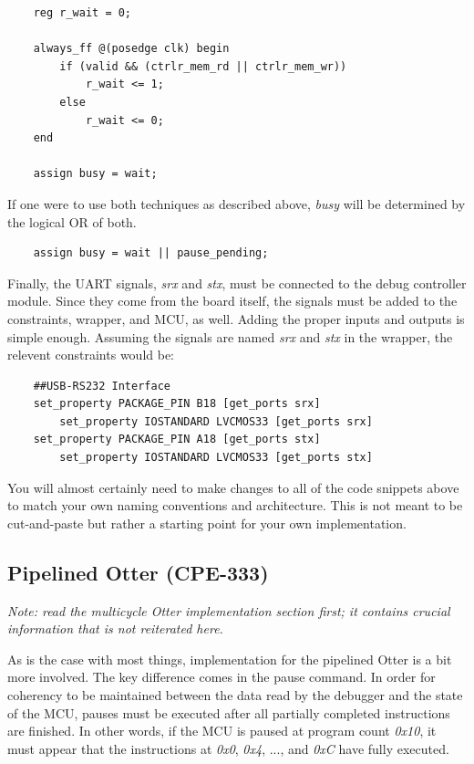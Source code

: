 \documentclass[10pt,a4paper]{article}
\begin{document}
\begin{verbatim}
    reg r_wait = 0;

    always_ff @(posedge clk) begin
        if (valid && (ctrlr_mem_rd || ctrlr_mem_wr))
            r_wait <= 1;
        else
            r_wait <= 0;
    end

    assign busy = wait;
\end{verbatim}

If one were to use both techniques as described above, \emph{busy} will be determined by the logical
OR of both.

\begin{verbatim}
    assign busy = wait || pause_pending;
\end{verbatim}

Finally, the UART signals, \emph{srx} and \emph{stx}, must be connected to the debug controller
module. Since they come from the board itself, the signals must be added to the constraints,
wrapper, and MCU, as well. Adding the proper inputs and outputs is simple enough. Assuming the
signals are named \emph{srx} and \emph{stx} in the wrapper, the relevent constraints would be:

\begin{verbatim}
    ##USB-RS232 Interface
    set_property PACKAGE_PIN B18 [get_ports srx]
        set_property IOSTANDARD LVCMOS33 [get_ports srx]
    set_property PACKAGE_PIN A18 [get_ports stx]
        set_property IOSTANDARD LVCMOS33 [get_ports stx]
\end{verbatim}

You will almost certainly need to make changes to all of the code snippets above to match your own
naming conventions and architecture. This is not meant to be cut-and-paste but rather a starting
point for your own implementation.

\subsection{Pipelined Otter (CPE-333)}

\small\emph{Note: read the multicycle Otter implementation section first; it contains crucial information that is not
reiterated here.}

\medskip

\noindent As is the case with most things, implementation for the pipelined Otter is a bit more involved. The
key difference comes in the pause command. In order for coherency to be maintained between the data
read by the debugger and the state of the MCU, pauses must be executed after all partially completed
instructions are finished. In other words, if the MCU is paused at program count \emph{0x10}, it
must appear that the instructions at \emph{0x0}, \emph{0x4}, ..., and \emph{0xC} have fully
executed.
\end{document}

